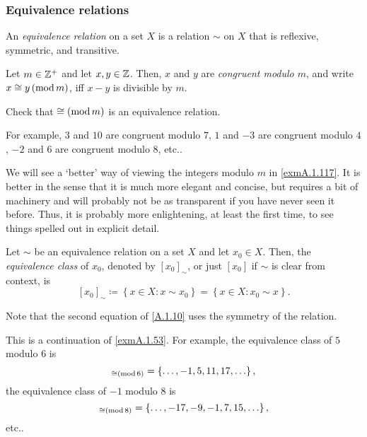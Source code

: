 \subsubsection{Equivalence relations}

\begin{dfn}
An \emph{equivalence relation} on a set $X$ is a relation $\sim$ on $X$ that is reflexive, symmetric, and transitive.
\end{dfn}
\begin{exm}\label{exmA.1.53}
Let $m\in \mathbb{Z} ^+$ and let $x,y\in \mathbb{Z}$.  Then, $x$ and $y$ are \emph{congruent modulo $m$}, and write $x\cong y\left( \mathrm{mod}\, m\right)$, iff $x-y$ is divisible by $m$.
\begin{exr}
Check that $\cong \left( \mathrm{mod}\, m\right)$ is an equivalence relation.
\end{exr}
For example, $3$ and $10$ are congruent modulo $7$, $1$ and $-3$ are congruent modulo $4$, $-2$ and $6$ are congruent modulo $8$, etc..
\begin{rmk}
We will see a `better' way of viewing the integers modulo $m$ in \cref{exmA.1.117}.  It is better in the sense that it is much more elegant and concise, but requires a bit of machinery and will probably not be as transparent if you have never seen it before.  Thus, it is probably more enlightening, at least the first time, to see things spelled out in explicit detail.
\end{rmk}
\end{exm}
\begin{dfn}
Let $\sim$ be an equivalence relation on a set $X$ and let $x_0\in X$.  Then, the \emph{equivalence class} of $x_0$, denoted by $[x_0]_\sim$\index[notation]{$[x_0]_\sim$}, or just $[x_0]$\index[notation]{$[x_0]$} if $\sim$ is clear from context, is
\begin{equation}\label{A.1.10}
[x_0]_\sim \coloneqq \left\{ x\in X:x\sim x_0\right\} =\left\{ x\in X:x_0\sim x\right\} .
\end{equation}
\begin{rmk}
Note that the second equation of \eqref{A.1.10} uses the symmetry of the relation.
\end{rmk}
\end{dfn}
\begin{exm}\label{exmA.1.57}
This is a continuation of \cref{exmA.1.53}.  For example, the equivalence class of $5$ modulo $6$ is
\begin{equation}
[5]_{\cong \mmod{6}}=\left\{ \ldots ,-1,5,11,17,\ldots \right\} ,
\end{equation}
the equivalence class of $-1$ modulo $8$ is
\begin{equation}
[1]_{\cong \mmod{8}}=\left\{ \ldots ,-17,-9,-1,7,15,\ldots \right\} ,
\end{equation}
etc..
\end{exm}
